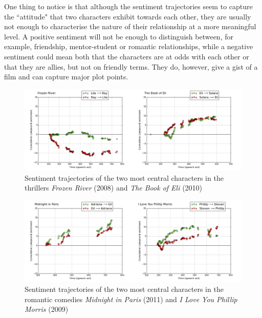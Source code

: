 \documentclass[bsc,frontabs,singlespacing,parskip, twoside]{infthesis}
\begin{document}
One thing to notice is that although the sentiment trajectories seem to capture the ``attitude" that two characters exhibit towards each other, they are usually not enough to characterise the nature of their relationship at a more meaningful level. A positive sentiment will not be enough to distinguish between, for example, friendship, mentor-student or romantic relationships, while a negative sentiment could mean both that the characters are at odds with each other or that they are allies, but not on friendly terms. They do, however, give a gist of a film and can capture major plot points. 

\begin{figure}[h!]
\begin{adjustwidth}{-0.5in}{-0.5in}
	\centering
	\includegraphics[scale=0.43]{figures/y_thrillers}
	\caption{Sentiment trajectories of the two most central characters in the thrillers \textit{Frozen River} (2008) and \textit{The Book of Eli} (2010)}
	\label{fig:thrillers}
\end{adjustwidth}
\end{figure}

\begin{figure}[h!]
\begin{adjustwidth}{-0.5in}{-0.5in}
	\centering
	\includegraphics[scale=0.43]{figures/y_romcoms}
	\caption{Sentiment trajectories of the two most central characters in the romantic comedies \textit{Midnight in Paris} (2011) and \textit{I Love You Phillip Morris} (2009)}
	\label{fig:romcoms}
\end{adjustwidth}
\end{figure}
\end{document}
